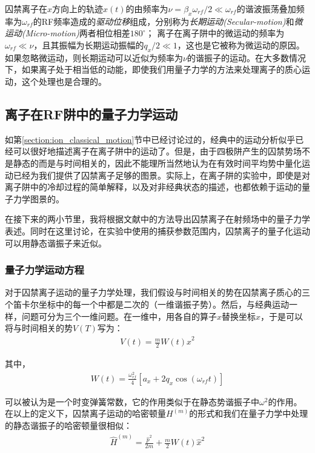 囚禁离子在$x$方向上的轨迹$x(t)$的由频率为$\nu=\beta_x\omega_{rf}/2\ll \omega_{rf}$的谐波振荡叠加频率为$\omega_{rf}$的RF频率造成的\emph{驱动位移}组成，分别称为\emph{长期运动(Secular-motion)}和\emph{微运动(Micro-motion)}两者相位相差$180^\circ$；
离子在离子阱中的微运动的频率为$\omega_{rf}\ll \nu$，且其振幅为长期运动振幅的$q_x/2\ll 1$，这也是它被称为微运动的原因。如果忽略微运动，则长期运动可以近似为频率为$\nu$的谐振子的运动。在大多数情况下，如果离子处于相当低的动能，即使我们用量子力学的方法来处理离子的质心运动，这个处理也是合理的。


\subsection[离子在RF阱中的量子力学运动]{离子在RF阱中的量子力学运动\label{section:quantum_motion}}

如第\ref{section:ion_classical_motion}节中已经讨论过的，经典中的运动分析似乎已经可以很好地描述离子在离子阱中的运动了。但是，由于四极阱产生的囚禁势场不是静态的而是与时间相关的，因此不能理所当然地认为在有效时间平均势中量化运动已经为我们提供了囚禁离子足够的图景。实际上，在离子阱的实验中，即使是对离子阱中的冷却过程的简单解释，以及对非经典状态的描述，也都依赖于运动的量子力学图景的。

在接下来的两小节里，我将根据文献\cite[]{Arimondo_Phillips_Strumia_1992}中的方法导出囚禁离子在射频场中的量子力学表述。同时在这里讨论，在实验中使用的捕获参数范围内，囚禁离子的量子化运动可以用静态谐振子来近似。

\subsubsection[量子力学运动方程]{量子力学运动方程}
对于囚禁离子运动的量子力学处理，我们假设与时间相关的势在囚禁离子质心的三个笛卡尔坐标中的每一个中都是二次的（一维谐振子势\cite[]{Solimeno_Di_Porto_Crosignani}）。然后，与经典运动一样，问题可分为三个一维问题。在一维中，用各自的算子$\hat{x}$替换坐标$x$，于是可以将与时间相关的势$V(T)$写为：
\begin{align}
    V(t)=\frac{m}{2}W(t)\hat{x}^2
\end{align}

其中，
\begin{align}
    W(t)=\frac{\omega_{rf}^2}{4}\left[a_x+2q_x\cos(\omega_{rf}t)\right]
\end{align}

可以被认为是一个时变弹簧常数，它的作用类似于在静态势谐振子中$\omega^2$的作用。在以上的定义下，囚禁离子运动的哈密顿量$H^{(m)}$的形式和我们在量子力学中处理的静态谐振子的哈密顿量很相似：
\begin{align}
    \hat{H}^{(m)}=\frac{\hat{p}^2}{2m}+\frac{m}{2}W(t)\hat{x}^2\label{eq:static_harmiltonian_oscillator}
\end{align}

